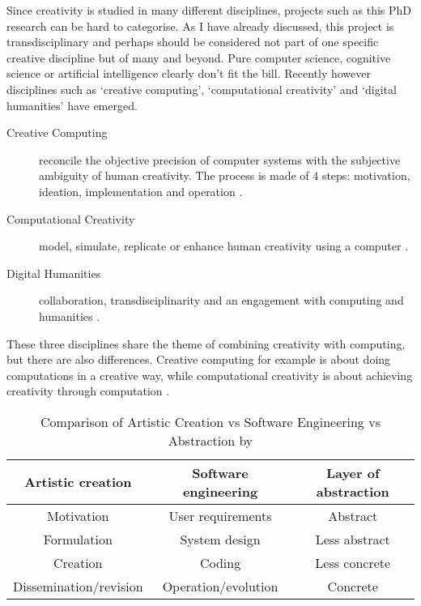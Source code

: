 Since creativity is studied in many different disciplines, projects such as this PhD research can be hard to categorise. As I have already discussed, this project is transdisciplinary and perhaps should be considered not part of one specific creative discipline but of many and beyond. Pure computer science, cognitive science or artificial intelligence clearly don't fit the bill. Recently however disciplines such as `creative computing', `computational creativity' and `digital humanities' have emerged.

\begin{description}
  \item [Creative Computing] reconcile the objective precision of computer systems with the subjective ambiguity of human creativity. The process is made of 4 steps: motivation, ideation, implementation and operation \autocite{Hugill2013c}.
  \item [Computational Creativity] model, simulate, replicate or enhance human creativity using a computer \autocite{Colton2012}.
  \item [Digital Humanities] collaboration, transdisciplinarity and an engagement with computing and humanities \autocite{Burdick2012}.
\end{description}

These three disciplines share the theme of combining creativity with computing, but there are also differences. Creative computing for example is about doing computations in a creative way, while computational creativity is about achieving creativity through computation \autocite{Hugill2013}.

\begin{table}[htbp]
\centering
\begin{tabu}{ccc}
\toprule
\textbf{Artistic creation} & \textbf{Software engineering} & \textbf{Layer of abstraction} \\
\midrule
Motivation & User requirements & Abstract \\
Formulation & System design & Less abstract \\
Creation & Coding & Less concrete \\
Dissemination/revision & Operation/evolution & Concrete \\
\bottomrule
\end{tabu}
\caption[Artistic Creation vs Software Engineering vs Abstraction]{Comparison of Artistic Creation vs Software Engineering vs Abstraction by \autocite{Hugill2013c}}
\label{tab:acsea}
\end{table}

